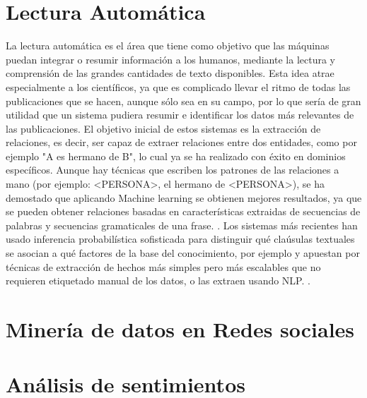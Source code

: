 \section*{Lectura Automática}
La lectura automática es el área que tiene como objetivo que las máquinas puedan integrar o resumir información a los humanos, mediante la lectura y comprensión de las grandes cantidades de texto disponibles. \newline
Esta idea atrae especialmente a los científicos, ya que es complicado llevar el ritmo de todas las publicaciones que se hacen, aunque sólo sea en su campo, por lo que sería de gran utilidad que un sistema pudiera resumir e identificar los datos más relevantes de las publicaciones. 
El objetivo inicial de estos sistemas es la extracción de relaciones, es decir, ser capaz de extraer relaciones entre dos entidades, como por ejemplo "A es hermano de B", lo cual ya se ha realizado con éxito en dominios específicos. Aunque hay técnicas que escriben los patrones de las relaciones a mano (por ejemplo: <PERSONA>, el hermano de <PERSONA>), se ha demostado que aplicando Machine learning se obtienen mejores resultados, ya que se pueden obtener relaciones basadas en características extraidas de secuencias de palabras y secuencias gramaticales de una frase. \citet{culotta2004dependency}.
\newline
Los sistemas más recientes han usado inferencia probabilística sofisticada para distinguir qué claúsulas textuales se asocian a qué factores de la base del conocimiento, por ejemplo \citet{niu2012deepdive}  y apuestan por técnicas de extracción de hechos más simples pero más escalables que no requieren etiquetado manual de los datos, o las extraen usando NLP. \citet{etzioni2011open}. 

     
\section*{Minería de datos en Redes sociales}

\section*{Análisis de sentimientos}